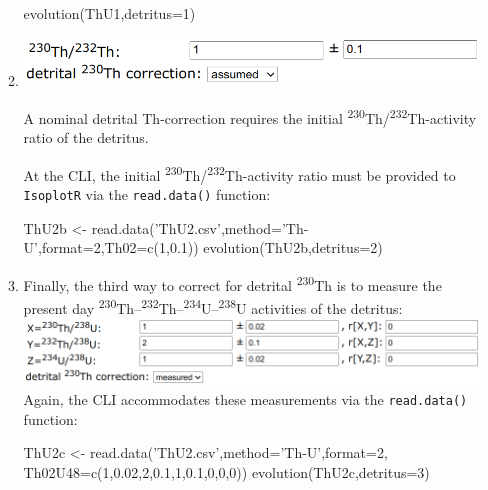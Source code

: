 \begin{refsection}
\begin{enumerate}
\begin{enumerate}
\begin{console}
evolution(ThU1,detritus=1)
\end{console}

  \item \begin{minipage}[t]{.7\linewidth}
    \strut\vspace*{-\baselineskip}\newline
    \includegraphics[width=\linewidth]{../figures/ThUinitialThassumed.png}
  \end{minipage}
    \begin{minipage}[t]{.3\linewidth}
      A nominal detrital Th-correction requires the initial
      \textsuperscript{230}Th/\textsuperscript{232}Th-activity ratio
      of the detritus.\\
    \end{minipage}

    At the CLI, the initial
    \textsuperscript{230}Th/\textsuperscript{232}Th-activity ratio
    must be provided to \texttt{IsoplotR} via the \texttt{read.data()}
    function:

\begin{script}
ThU2b <- read.data('ThU2.csv',method='Th-U',format=2,Th02=c(1,0.1))
evolution(ThU2b,detritus=2)
\end{script}

\item Finally, the third way to correct for detrital
  \textsuperscript{230}Th is to measure the present day
  \textsuperscript{230}Th--\textsuperscript{232}Th--\textsuperscript{234}U--\textsuperscript{238}U
  activities of the detritus:\\

  \noindent\includegraphics[width=\linewidth]{../figures/ThUmeasureddetritus.png}\\

 Again, the CLI accommodates these measurements via the
 \texttt{read.data()} function:

\begin{script}
ThU2c <- read.data('ThU2.csv',method='Th-U',format=2,
                   Th02U48=c(1,0.02,2,0.1,1,0.1,0,0,0))
evolution(ThU2c,detritus=3)
\end{script}
  

\end{enumerate}
\end{enumerate}
\end{refsection}
